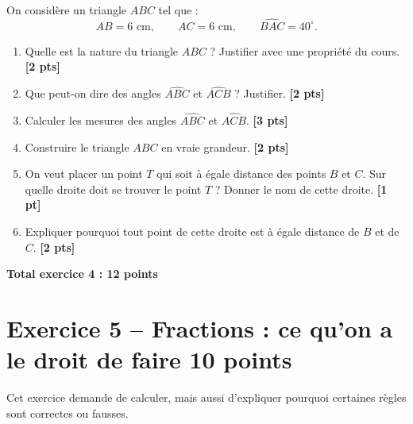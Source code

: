 \documentclass[11pt,a4paper]{article}
\newcommand{\pts}[1]{\hfill \textbf{[#1 pt]}}
\newcommand{\ptss}[1]{\hfill \textbf{[#1 pts]}}
\begin{document}
On considère un triangle $ABC$ tel que :
\[
AB=6\text{ cm}, \qquad AC=6\text{ cm}, \qquad \widehat{BAC}=40^\circ.
\]

\begin{enumerate}[label=\textbf{\arabic*)}]

\item Quelle est la nature du triangle $ABC$ ? Justifier avec une propriété du cours. \ptss{2}

\item Que peut-on dire des angles $\widehat{ABC}$ et $\widehat{ACB}$ ? Justifier. \ptss{2}

\item Calculer les mesures des angles $\widehat{ABC}$ et $\widehat{ACB}$. \ptss{3}

\item Construire le triangle $ABC$ en vraie grandeur. \ptss{2}

\item On veut placer un point $T$ qui soit à égale distance des points $B$ et $C$.
Sur quelle droite doit se trouver le point $T$ ? Donner le nom de cette droite. \pts{1}

\item Expliquer pourquoi tout point de cette droite est à égale distance de $B$ et de $C$. \ptss{2}

\end{enumerate}

\hfill \textbf{Total exercice 4 : 12 points}

\section*{Exercice 5 -- Fractions : ce qu'on a le droit de faire \hfill 10 points}

Cet exercice demande de calculer, mais aussi d'expliquer pourquoi certaines règles sont correctes ou fausses.
\end{document}
